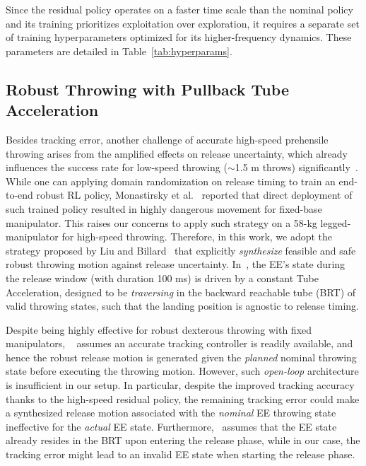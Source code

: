 \documentclass[letterpaper, 10 pt, conference]{ieeeconf} %
\begin{document}
Since the residual policy operates on a faster time scale than the nominal policy and its training prioritizes exploitation over exploration, it requires a separate set of training hyperparameters optimized for its higher-frequency dynamics. These parameters are detailed in Table~\ref{tab:hyperparams}.



\subsection{Robust Throwing with Pullback Tube Acceleration}
Besides tracking error, another challenge of accurate high-speed prehensile throwing arises from the amplified effects on release uncertainty, which already influences the success rate for low-speed throwing ($\sim$1.5 m throws) significantly~\cite{monastirsky2022learning, liu2024tube}. While one can applying domain randomization on release timing to train an end-to-end robust RL policy, Monastirsky et al.~\cite{monastirsky2022learning} reported that direct deployment of such trained policy resulted in highly dangerous movement for fixed-base manipulator. This raises our concerns to apply such strategy on a 58-kg legged-manipulator for high-speed throwing. Therefore, in this work, we adopt the strategy proposed by Liu and Billard~\cite{liu2024tube} that explicitly \emph{synthesize} feasible and safe robust throwing motion against release uncertainty. In~\cite{liu2024tube}, the EE's state during the release window (with duration 100 ms) is driven by a constant Tube Acceleration, designed to be \emph{traversing} in the backward reachable tube (BRT) of valid throwing states, such that the landing position is agnostic to release timing.

Despite being highly effective for robust dexterous throwing with fixed manipulators, ~\cite{liu2024tube} assumes an accurate tracking controller is readily available, and hence the robust release motion is generated given the \emph{planned} nominal throwing state before executing the throwing motion. However, such \emph{open-loop} architecture is insufficient in our setup. In particular, despite the improved tracking accuracy thanks to the high-speed residual policy, the remaining tracking error could make a synthesized release motion associated with the \emph{nominal} EE throwing state ineffective for the \emph{actual} EE state. Furthermore,~\cite{liu2024tube} assumes that the EE state already resides in the BRT upon entering the release phase, while in our case, the tracking error might lead to an invalid EE state when starting the release phase.
\end{document}
